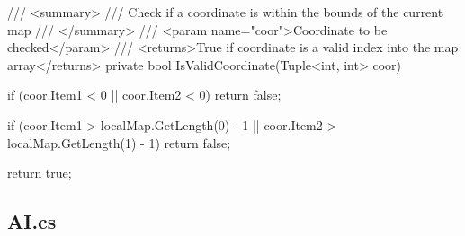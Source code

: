 \documentclass[11pt]{article}
\begin{document}
\begin{code}
{{        /// <summary>
        /// Check if a coordinate is within the bounds of the current map
        /// </summary>
        /// <param name="coor">Coordinate to be checked</param>
        /// <returns>True if coordinate is a valid index into the map array</returns>
        private bool IsValidCoordinate(Tuple<int, int> coor)
        {
            if (coor.Item1 < 0 || coor.Item2 < 0)
            {
                return false;
            }

            if (coor.Item1 > localMap.GetLength(0) - 1
              || coor.Item2 > localMap.GetLength(1) - 1)
            {
                return false;
            }

            return true;
        }
    }
}
\end{code}
\subsection*{AI.cs}
\end{document}
